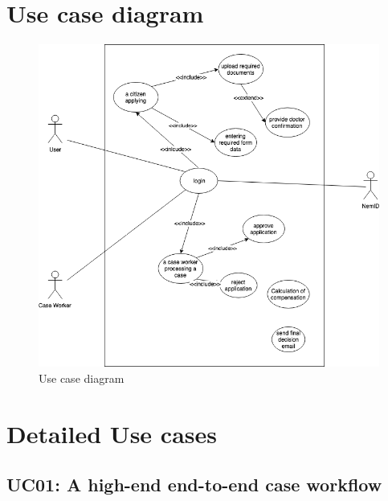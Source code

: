 \newpage
\section{Use case diagram}
\begin{figure}[hbt!]
	\includegraphics[width=\textwidth]{img/use-cases}
	\caption{Use case diagram}
\end{figure}

\newpage
\section{Detailed Use cases}

\subsection{UC01: A high-end end-to-end case workflow}

